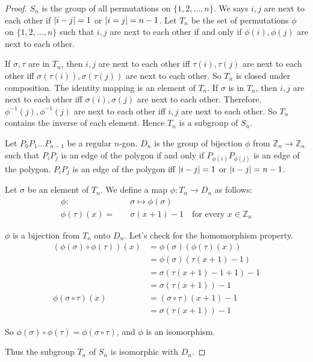 \begin{proof}
    $S_{n}$ is the group of all permutations on $\{ 1, 2, \ldots, n \}$. We says $i, j$ are next to each other if $\left\vert{i - j}\right\vert = 1$ or $\left\vert{i = j}\right\vert = n - 1$. Let $T_{n}$ be the set of permutations $\phi$ on $\{ 1, 2, \ldots, n \}$ such that $i, j$ are next to each other if and only if $\phi(i), \phi(j)$ are next to each other.

    If $\sigma, \tau$ are in $T_{n}$, then $i, j$ are next to each other iff $\tau(i), \tau(j)$ are next to each other iff $\sigma(\tau(i)), \sigma(\tau(j))$ are next to each other. So $T_{n}$ is closed under composition. The identity mapping is an element of $T_{n}$. If $\sigma$ is in $T_{n}$, then $i, j$ are next to each other iff $\sigma(i), \sigma(j)$ are next to each other. Therefore, $\phi^{-1}(j), \phi^{-1}(j)$ are next to each other iff $i, j$ are next to each other. So $T_{n}$ contains the inverse of each element. Hence $T_{n}$ is a subgroup of $S_{n}$.

    Let $P_{0}P_{1}\ldots P_{n-1}$ be a regular $n$-gon. $D_{n}$ is the group of bijection $\phi$ from $\mathbb{Z}_{n} \to \mathbb{Z}_{n}$ such that $P_{i}P_{j}$ is an edge of the polygon if and only if $P_{\phi(i)}P_{\phi(j)}$ is an edge of the polygon. $P_{i}P_{j}$ is an edge of the polygon iff $\left\vert{i - j}\right\vert = 1$ or $\left\vert{i - j}\right\vert = n - 1$.

    Let $\sigma$ be an element of $T_{n}$. We define a map $\phi: T_{n} \to D_{n}$ as follows:
    \begin{align*}
        \phi:          & \quad\sigma \mapsto \phi(\sigma) \\
        \phi(\tau)(x)= & \quad\sigma(x + 1) - 1\quad \text{for every $x\in\mathbb{Z}_{n}$}
    \end{align*}

    $\phi$ is a bijection from $T_{n}$ onto $D_{n}$. Let's check for the homomorphism property.
    \begin{align*}
        (\phi(\sigma)\circ\phi(\tau))(x) & = \phi(\sigma)(\phi(\tau)(x)) \\
                                         & = \phi(\sigma)(\tau(x + 1) - 1) \\
                                         & = \sigma(\tau(x + 1) - 1 + 1) - 1 \\
                                         & = \sigma(\tau(x + 1)) - 1 \\
        \phi(\sigma\circ\tau)(x)         & = (\sigma\circ\tau)(x + 1) - 1 \\
                                         & = \sigma(\tau(x + 1)) - 1
    \end{align*}

    So $\phi(\sigma)\circ\phi(\tau) = \phi(\sigma\circ\tau)$, and $\phi$ is an isomorphism.

    Thus the subgroup $T_{n}$ of $S_{n}$ is isomorphic with $D_{n}$.
\end{proof}

